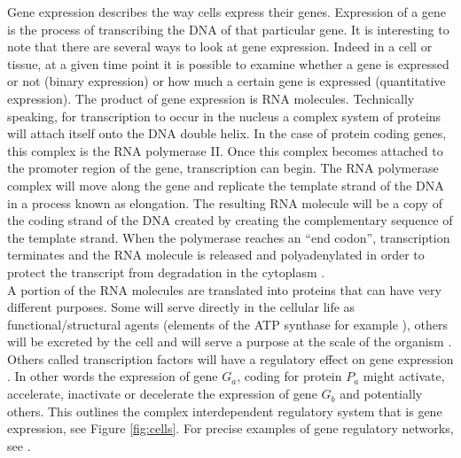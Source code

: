	Gene expression describes the way cells express their genes. Expression of a gene is the process of transcribing the DNA of that particular gene. It is interesting to note that there are several ways to look at gene expression. Indeed in a cell or tissue, at a given time point it is possible to examine whether a gene is expressed or not (binary expression) or how much a certain gene is expressed (quantitative expression). The product of gene expression is RNA molecules. Technically speaking, for transcription to occur in the nucleus a complex system of proteins will attach itself onto the DNA double helix. In the case of protein coding genes, this complex is the RNA polymerase II. Once this complex becomes attached to the promoter region of the gene, transcription can begin. The RNA polymerase complex will move along the gene and replicate the template strand of the DNA in a process known as elongation. The resulting RNA molecule will be a copy of the coding strand of the DNA created by creating the complementary sequence of the template strand. When the polymerase reaches an ``end codon'', transcription terminates and the RNA molecule is released and polyadenylated in order to protect the transcript from degradation in the cytoplasm \citep{cooper00}.\\
	
	A portion of the RNA molecules are translated into proteins that can have very different purposes. Some will serve directly in the cellular life as functional/structural agents (elements of the ATP synthase for example \citep{boyer97}), others will be excreted by the cell and will serve a purpose at the scale of the organism \citep{kaiser84}. Others called transcription factors will have a regulatory effect on gene expression \citep{mitchell89}. In other words the expression of gene $G_a$, coding for protein $P_a$ might activate, accelerate, inactivate or decelerate the expression of gene $G_b$ and potentially others. This outlines the complex interdependent regulatory system that is gene expression, see Figure \ref{fig:cells}. For precise examples of gene regulatory networks, see \citep{gossen92, shinozaki03,fuqua01,balmer02}.\\
	
